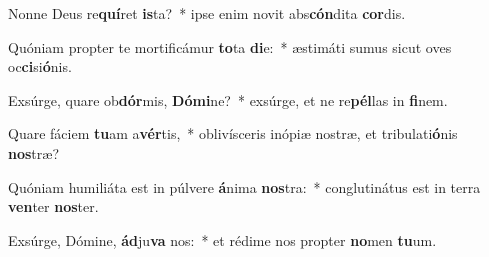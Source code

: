 \item Nonne Deus re\textbf{quí}ret \textbf{is}ta?~* ipse enim novit abs\textbf{cón}dita \textbf{cor}dis.
\item Quóniam propter te mortificámur \textbf{to}ta \textbf{di}e:~* æstimáti sumus sicut oves oc\textbf{ci}si\textbf{ó}nis.
\item Exsúrge, quare ob\textbf{dór}mis, \textbf{Dó}\textbf{mi}ne?~* exsúrge, et ne re\textbf{pél}las in \textbf{fi}nem.
\item Quare fáciem \textbf{tu}am a\textbf{vér}tis,~* oblivísceris inópiæ nostræ, et tribulati\textbf{ó}nis \textbf{nos}træ?
\item Quóniam humiliáta est in púlvere \textbf{á}nima \textbf{nos}tra:~* conglutinátus est in terra \textbf{ven}ter \textbf{nos}ter.
\item Exsúrge, Dómine, \textbf{ád}ju\textbf{va} nos:~* et rédime nos propter \textbf{no}men \textbf{tu}um.
